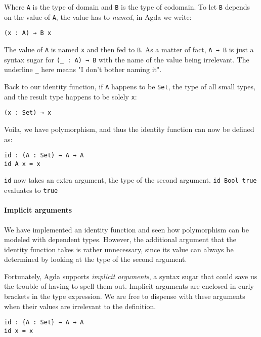 \documentclass[../thesis.tex]{subfiles}
\begin{document}
Where {\lstinline|A|} is the type of domain and {\lstinline|B|} is the type of
codomain. To let {\lstinline|B|} depends on the value of {\lstinline|A|}, the
value has to \textit{named}, in Agda we write:

\begin{lstlisting}
(x : A) → B x
\end{lstlisting}

The value of {\lstinline|A|} is named {\lstinline|x|} and then fed to {\lstinline|B|}.
As a matter of fact, {\lstinline|A → B|} is just a syntax sugar for {\lstinline|(_ : A) → B|}
with the name of the value being irrelevant. The underline {\lstinline|_|} here
means "I don't bother naming it".

Back to our identity function, if {\lstinline|A|} happens to be {\lstinline|Set|},
the type of all small types, and the result type happens to be solely {\lstinline|x|}:

\begin{lstlisting}
(x : Set) → x
\end{lstlisting}

Voila, we have polymorphism, and thus the identity function can now be defined as:

\begin{lstlisting}
id : (A : Set) → A → A
id A x = x
\end{lstlisting}

{\lstinline|id|} now takes an extra argument, the type of the second argument.
{\lstinline|id Bool true|} evaluates to {\lstinline|true|}

\paragraph{Implicit arguments}

We have implemented an identity function and seen how polymorphism can be modeled
with dependent types. However, the additional argument that the identity function
takes is rather unnecessary, since its value can always be determined by looking
at the type of the second argument.

Fortunately, Agda supports \textit{implicit arguments}, a syntax sugar that could
save us the trouble of having to spell them out. Implicit arguments are enclosed
in curly brackets in the type expression. We are free to dispense with these arguments
when their values are irrelevant to the definition.

\begin{lstlisting}
id : {A : Set} → A → A
id x = x
\end{lstlisting}
\end{document}
